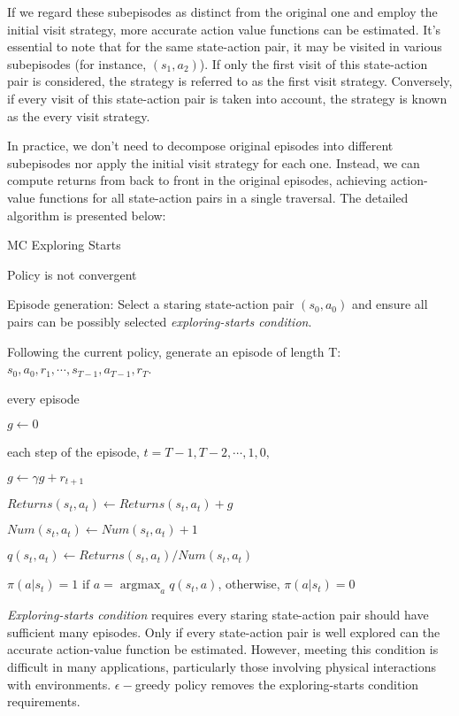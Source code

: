     If we regard these subepisodes as distinct from the original one and employ the initial visit strategy, more accurate action value functions can be
    estimated. It's essential to note that for the same state-action pair, it may be visited in various subepisodes (for instance, $(s_{1},a_{2})$). If only the
    first visit of this state-action pair is considered, the strategy is referred to as the first visit strategy. Conversely, if every visit of this
    state-action pair is taken into account, the strategy is known as the every visit strategy. \par

    In practice, we don't need to decompose original episodes into different subepisodes nor apply the initial visit strategy for each one. Instead, we can
    compute returns from back to front in the original episodes, achieving action-value functions for all state-action pairs in a single traversal. The detailed
    algorithm is presented below:

    \begin{algorithm}
      \caption{MC Exploring Starts}  
      \While
      {Policy is not convergent}{ Episode generation: Select a staring state-action pair $(s_{0},a_{0})$ and ensure all pairs can be possibly selected
      \emph{exploring-starts condition}. \par Following the current policy, generate an episode of length T: $s_{0},a_{0},r_{1},\cdots,s_{T-1},a_{T-1},r_{T}$.
      \par
      \For
      {every episode}{ $g \gets 0$ \par
      \For
      {each step of the episode, $t=T-1,T-2,\cdots,1,0,$}{ $g \gets \gamma g+r_{t+1}$ \par {} $Returns(s_{t},a_{t}) \gets
        Returns(s_{t},a_{t})+g$ \par $Num(s_{t},a_{t}) \gets Num(s_{t},a_{t})+1$ \par {} $q(s_{t},a_{t}) \gets Returns(s_{t},
        a_{t})/Num(s_{t},a_{t})$ \par {} $\pi(a|s_{t})=1 \text{ if } a=\mathop{\arg \max}_{a}q(s_{t},a)$, otherwise, $\pi(a|s_{t})=0$

      }}}
    \end{algorithm}

    \emph{Exploring-starts condition} requires every staring state-action pair should have sufficient many episodes. Only if every state-action pair is well
    explored can the accurate action-value function be estimated. However, meeting this condition is difficult in many applications, particularly those
    involving physical interactions with environments. $\epsilon-$greedy policy removes the exploring-starts condition requirements.

